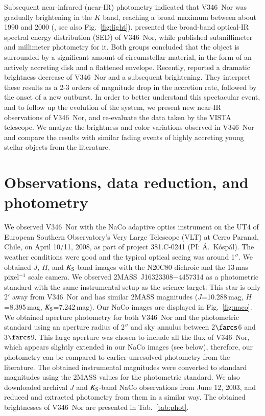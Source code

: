 \documentclass{aa}
\begin{document}
Subsequent near-infrared (near-IR) photometry indicated that V346~Nor
was gradually brightening in the $K$ band, reaching a broad maximum
between about 1990 and 2000 (\citealt{frogel1983, reipurth1983b,
  reipurth1985, kh1991, molinari1993, prusti1993, reipurth1997,
  abraham2004}, see also Fig.~\ref{fig:light}). \citet{kh1991}
presented the broad-band optical-IR spectral energy distribution (SED)
of V346~Nor, while \citet{weintraub1991} published submillimeter and
millimeter photometry for it. Both groups concluded that the object is
surrounded by a significant amount of circumstellar material, in the
form of an actively accreting disk and a flattened envelope. Recently,
\citet{kraus2016} reported a dramatic brightness decrease of V346~Nor
and a subsequent brightening. They interpret these results as a 2-3
orders of magnitude drop in the accretion rate, followed by the onset
of a new outburst. In order to better understand this spectacular
event, and to follow up the evolution of the system, we present new
near-IR observations of V346~Nor, and re-evaluate the data taken by
the VISTA telescope. We analyze the brightness and color variations
observed in V346~Nor and compare the results with similar fading
events of highly accreting young stellar objects from the literature.

\section{Observations, data reduction, and photometry}

We observed V346~Nor with the NaCo adaptive optics instrument on the
UT4 of European Southern Observatory's Very Large Telescope (VLT) at
Cerro Paranal, Chile, on April 10/11, 2008, as part of project
381.C-0241 (PI: \'A.~K\'osp\'al). The weather conditions were good and
the typical optical seeing was around 1$''$. We obtained $J$, $H$, and
$K_{\rm S}$-band images with the N20C80 dichroic and the
13\,mas\,pixel$^{-1}$ scale camera. We observed
2MASS~J16323308$-$4457314 as a photometric standard with the same
instrumental setup as the science target. This star is only 2$'$ away
from V346~Nor and has similar 2MASS magnitudes ($J$=10.288\,mag,
$H$=8.395\,mag, $K_{\rm S}$=7.242\,mag). Our NaCo images are displayed
in Fig.~\ref{fig:naco}. We obtained aperture photometry for both
V346~Nor and the photometric standard using an aperture radius of
2$''$ and sky annulus between 2$\farcs$6 and 3$\farcs$9. This large
aperture was chosen to include all the flux of V346~Nor, which appears
slightly extended in our NaCo images (see below), therefore, our
photometry can be compared to earlier unresolved photometry from the
literature. The obtained instrumental magnitudes were converted to
standard magnitudes using the 2MASS values for the photometric
standard. We also downloaded archival $J$ and $K_{\rm S}$-band
  NaCo observations from June 12, 2003, and reduced and extracted
  photometry from them in a similar way. The obtained brightnesses of
V346~Nor are presented in Tab.~\ref{tab:phot}.
\end{document}
